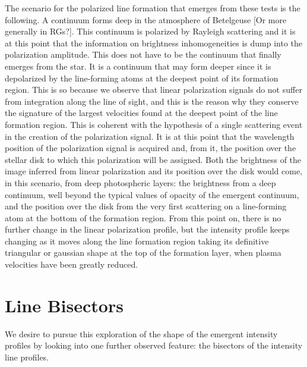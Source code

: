 \documentclass{/Users/art2/TeX/aanda/aa}
\begin{document}
The scenario for the polarized line formation that emerges from these tests is the following. A continuum forms deep in the atmosphere of Betelgeuse [Or more generally in RGs?]. This continuum is 
polarized by Rayleigh scattering and it is at this point that the information on brightness inhomogeneities is dump into the polarization amplitude. 
This does not have to be the continuum that finally emerges from the star. It is a continuum that may form deeper since it is depolarized by the line-forming atoms 
at the deepest point of its formation region. This is so because we observe that linear polarization signals do not suffer from integration along the line of sight, 
and this is the reason why they conserve 
the signature of the largest velocities found at the deepest point of the line formation region. This is coherent with the hypothesis of a single 
scattering event in the creation of the polarization signal. It is at this point that the wavelength position of the polarization signal is acquired and,
from it, the position over the stellar disk to which this polarization will be assigned. Both the brightness of the image inferred from linear polarization 
and its position over the disk would come, in this scenario, from deep photospheric layers: the brightness from a deep continuum, well beyond the 
typical values of opacity of the emergent continuum, and the position over the disk from the very first scattering on a line-forming atom at the bottom 
of the formation region.   From this point on, there is no further change in the linear polarization profile, but the intensity profile keeps changing 
as it moves along the line formation region taking its definitive triangular or gaussian shape at the top of the formation layer, when plasma velocities 
have been greatly reduced. 


\section{Line Bisectors}

We desire to pursue this exploration of the shape of the emergent intensity profiles by looking into one further observed feature: the bisectors 
of the intensity line profiles.
\end{document}
